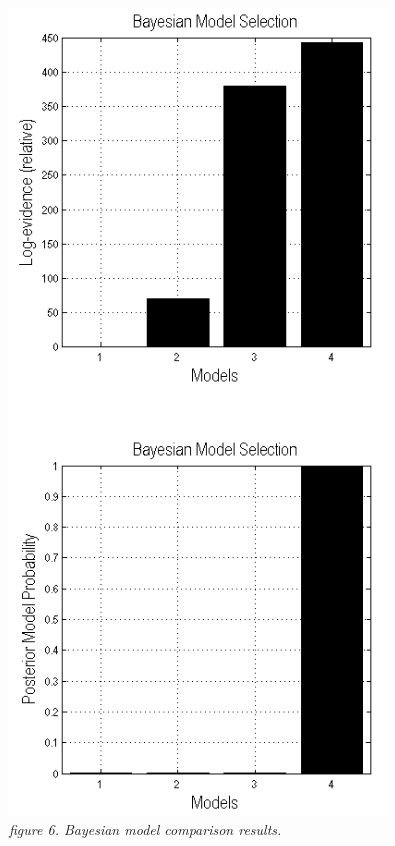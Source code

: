 \begin{figure}
\begin{center}
\includegraphics[width=100mm]{dcm_ir/figures/figure6}
\caption{\em  figure 6. Bayesian model comparison results.\label{dcm-ir:fig:4}}
\end{center}
\end{figure}